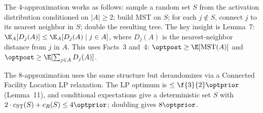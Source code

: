 \begin{center}
\renewcommand{\arraystretch}{1.4}
\end{center}

\begin{remark}
    The $4$-approximation works as follows: sample a random set $S$ from the activation distribution conditioned on $|A| \ge 2$; build MST on $S$; for each $j \notin S$, connect $j$ to its nearest neighbor in $S$; double the resulting tree. The key insight is Lemma~7: $\E_A[D_j(A)] \le \E_A[D_j(A) \mid j \in A]$, where $D_j(A)$ is the nearest-neighbor distance from $j$ in $A$. This uses Facts~3 and~4: $\optpost \ge \E[\text{MST}(A)]$ and $\optpost \ge \E[\sum_{j \in A} D_j(A)]$.

    The $8$-approximation uses the same structure but derandomizes via a Connected Facility Location LP relaxation. The LP optimum is $\le \f{3}{2}\optprior$ (Lemma~11), and conditional expectations give a deterministic set $S$ with $2 \cdot c_{\mathrm{ST}}(S) + c_R(S) \le 4\optprior$; doubling gives $8\optprior$.
\end{remark}

